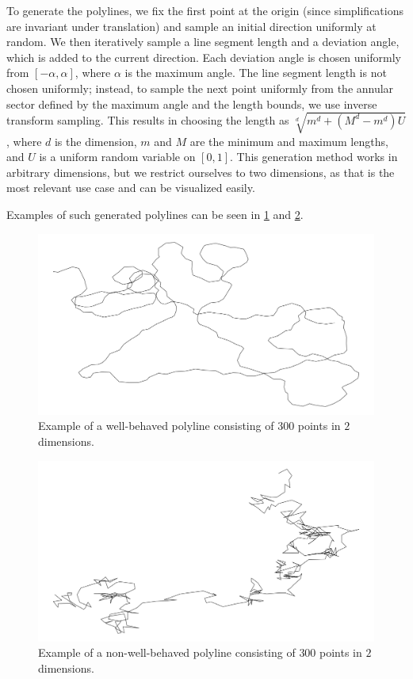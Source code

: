To generate the polylines, we fix the first point at the origin (since simplifications are invariant under translation) and sample an initial direction uniformly at random. We then iteratively sample a line segment length and a deviation angle, which is added to the current direction. Each deviation angle is chosen uniformly from \([-\alpha, \alpha]\), where \(\alpha\) is the maximum angle. The line segment length is not chosen uniformly; instead, to sample the next point uniformly from the annular sector defined by the maximum angle and the length bounds, we use inverse transform sampling. This results in choosing the length as \(\sqrt[d]{m^d + (M^d - m^d)U}\), where \(d\) is the dimension, \(m\) and \(M\) are the minimum and maximum lengths, and \(U\) is a uniform random variable on \([0,1]\). This generation method works in arbitrary dimensions, but we restrict ourselves to two dimensions, as that is the most relevant use case and can be visualized easily.

Examples of such generated polylines can be seen in \cref{fig:well-behaved-300} and \cref{fig:non-well-behaved-300}.

\begin{figure}[b]
  \centering
  \includegraphics[scale=0.3]{./figures/well-behaved-300.png}
  \caption{Example of a well-behaved polyline consisting of \(300\) points in \(2\) dimensions.}
  \label{fig:well-behaved-300}
\end{figure}

\begin{figure}[b]
  \centering
	\includegraphics[scale=0.3]{./figures/non-well-behaved-300.png}
  \caption{Example of a non-well-behaved polyline consisting of \(300\) points in \(2\) dimensions.}
  \label{fig:non-well-behaved-300}
\end{figure}

